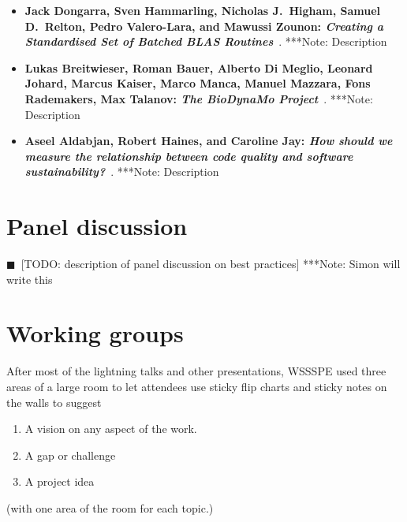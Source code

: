 \documentclass[11pt, oneside]{amsart}
\newcommand{\todo}[1]{{\color{blue}$\blacksquare$~\textsf{[TODO: #1]}}}
\newcommand{\note}[1]{ {\textcolor{blueish}    { ***Note:      #1 }}}
\begin{document}
\begin{itemize}[itemsep=1ex]
    \item \textbf{Jack Dongarra, Sven Hammarling, Nicholas J.\ Higham, Samuel
    D.\ Relton\textsuperscript{\textasteriskcentered}, Pedro Valero-Lara,
    and Mawussi Zounon: \textit{Creating a Standardised Set of Batched
    BLAS Routines}}~\cite{Dongarra:2016ws}.
    \note{Description}

    \item \textbf{Lukas Breitwieser\textsuperscript{\textasteriskcentered},
    Roman Bauer, Alberto Di Meglio, Leonard Johard,
    Marcus Kaiser, Marco Manca, Manuel Mazzara, Fons Rademakers,
    Max Talanov: \textit{The BioDynaMo Project}}~\cite{Bauer:2016ws}.
    \note{Description}

    \item \textbf{Aseel Aldabjan, Robert Haines, and
    Caroline Jay\textsuperscript{\textasteriskcentered}: \textit{How should we
    measure the relationship between code quality and software
    sustainability?}}~\cite{Aldabjan:2016ws}.
    \note{Description}

\end{itemize}

\section{Panel discussion} \label{sec:panel}

\todo{description of panel discussion on best practices} \note{Simon will write this}

\section{Working groups} \label{sec:WGs}

After most of the lightning talks and other presentations, WSSSPE used three areas of a large room to let
attendees use sticky flip charts and sticky notes on the walls to suggest
\begin{enumerate}
\item A vision on any aspect of the work.
\item A gap or challenge
\item A project idea
\end{enumerate}
(with one area of the room for each topic.)
\end{document}
